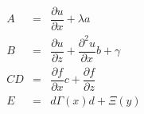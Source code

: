 \documentclass{book}
\begin{document}
\begin{tcolorbox}[opteqC]
	\begin{eqnarray}
	A &=& \dfrac{\partial u}{\partial x} + \lambda a \\[0.5cm]
	B &=& \dfrac{\partial u}{\partial z}
	+ \dfrac{\partial^2 u}{\partial x} b + \gamma \\[0.5cm]
	CD &=&\dfrac{\partial f}{\partial x} c
	+ \dfrac{\partial f}{\partial z} \\[0.5cm]
	E &=& d\Gamma(x) d + \Xi(y)
	\end{eqnarray}
\end{tcolorbox}
\end{document}
